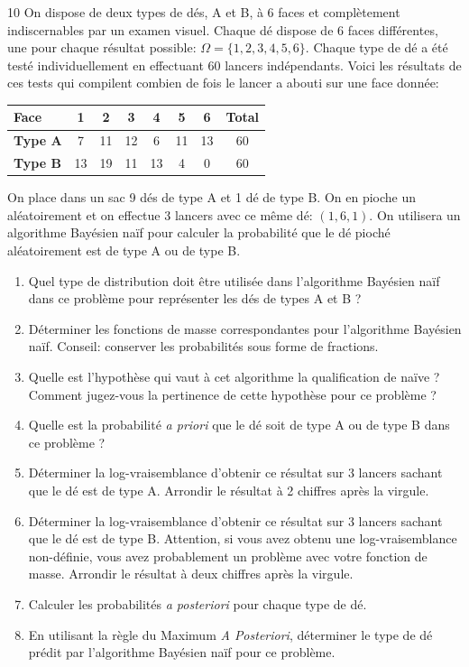 \documentclass[solutions]{../cc}
\begin{document}
	\begin{exopoints}{10}
		On dispose de deux types de dés, A et B, à 6 faces et complètement indiscernables par un examen visuel. Chaque dé dispose de 6 faces différentes, une pour chaque résultat possible: $\Omega = \{1, 2, 3, 4, 5, 6\}$. Chaque type de dé a été testé individuellement en effectuant 60 lancers indépendants. Voici les résultats de ces tests qui compilent combien de fois le lancer a abouti sur une face donnée:
		
		\begin{table}[h]
			\centering
			\begin{tabular}{|l|c|c|c|c|c|c|c|}
				\hline
				\textbf{Face} & 1 & 2 & 3 & 4 & 5 & 6 & \textbf{Total} \\
				\hline
				\textbf{Type A} & 7 & 11 & 12 & 6 & 11 & 13 & 60 \\
				\hline
				\textbf{Type B} & 13 & 19 & 11 & 13 & 4 & 0 & 60 \\
				\hline
			\end{tabular}
		\end{table}
		
		On place dans un sac 9 dés de type A et 1 dé de type B. On en pioche un aléatoirement et on effectue 3 lancers avec ce même dé: $(1, 6, 1)$. On utilisera un algorithme Bayésien naïf pour calculer la probabilité que le dé pioché aléatoirement est de type A ou de type B.

		\begin{enumerate}
			\item Quel type de distribution doit être utilisée dans l'algorithme Bayésien naïf dans ce problème pour représenter les dés de types A et B ? 
			\item Déterminer les fonctions de masse correspondantes pour l'algorithme Bayésien naïf. Conseil: conserver les probabilités sous forme de fractions.
			\item Quelle est l'hypothèse qui vaut à cet algorithme la qualification de naïve ? Comment jugez-vous la pertinence de cette hypothèse pour ce problème ? 
			\item Quelle est la probabilité \textit{a priori} que le dé soit de type A ou de type B dans ce problème ? 
			\item Déterminer la log-vraisemblance d'obtenir ce résultat sur 3 lancers sachant que le dé est de type A. Arrondir le résultat à 2 chiffres après la virgule. 
			\item Déterminer la log-vraisemblance d'obtenir ce résultat sur 3 lancers sachant que le dé est de type B. Attention, si vous avez obtenu une log-vraisemblance non-définie, vous avez probablement un problème avec votre fonction de masse. Arrondir le résultat à deux chiffres après la virgule.
			\item Calculer les probabilités \textit{a posteriori} pour chaque type de dé. 
			\item En utilisant la règle du Maximum \textit{A Posteriori}, déterminer le type de dé prédit par l'algorithme Bayésien naïf pour ce problème. 
		\end{enumerate}
	\end{exopoints}
	
\end{document}
